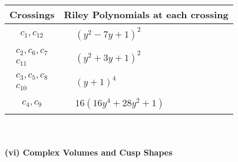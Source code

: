 \documentclass[1p]{elsarticle_modified}
\theoremstyle{definition}
\begin{document}
\begin{tabular}{m{50pt}|m{274pt}}
Crossings & \hspace{64pt}Riley Polynomials at each crossing \\
\hline $$\begin{aligned}c_{1},c_{12}\end{aligned}$$&$\begin{aligned}
&(y^2-7 y+1)^2
\end{aligned}$\\
\hline $$\begin{aligned}c_{2},c_{6},c_{7}\\c_{11}\end{aligned}$$&$\begin{aligned}
&(y^2+3 y+1)^2
\end{aligned}$\\
\hline $$\begin{aligned}c_{3},c_{5},c_{8}\\c_{10}\end{aligned}$$&$\begin{aligned}
&(y+1)^4
\end{aligned}$\\
\hline $$\begin{aligned}c_{4},c_{9}\end{aligned}$$&$\begin{aligned}
&16(16 y^4+28 y^2+1)
\end{aligned}$\\
\hline
\end{tabular}\\~\\
\newpage\flushleft \textbf{(vi) Complex Volumes and Cusp Shapes}
\end{document}
